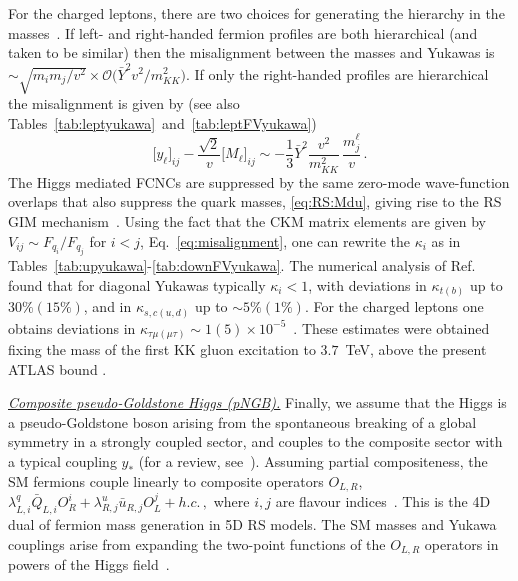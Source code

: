 \documentclass[../report.tex]{subfiles}
\newcommand{\mcO}{\mathcal{O}}
\newcommand{\yvmkk}{\bar Y^2 \frac{v^2}{m_{KK}^2}}
\begin{document}
For the charged leptons, there are two choices for generating the hierarchy in
the masses~\cite{Azatov:2009na}. If left- and right-handed fermion profiles are
both hierarchical (and taken to be similar) then the misalignment between the
masses and Yukawas is $\sim \sqrt{{m_i m_j}/{v^2}} \times \mcO\big(\bar Y^2
v^2/m_{KK}^2\big)$. If only the right-handed profiles are hierarchical the
misalignment is given by (see also
Tables~\ref{tab:leptyukawa}~and~\ref{tab:leptFVyukawa})
\begin{equation}\label{eq:lept-misalignment}
	\big[y_\ell\big]_{ij}-\frac{\sqrt2}{v}\big[M_\ell\big]_{ij}\sim -
	\frac{1}{3}\yvmkk\,\frac{m_j^\ell}{v}\,. \end{equation} The Higgs mediated FCNCs
are suppressed by the same zero-mode wave-function overlaps that also suppress
the quark masses, \eqref{eq:RS:Mdu}, giving rise to the RS GIM
mechanism~\cite{Cacciapaglia:2007fw, Agashe:2004cp, Agashe:2004ay}. Using the
fact that the CKM matrix elements are given by $V_{ij}\sim F_{q_i}/F_{q_j}$ for
$i<j$, Eq.~\eqref{eq:misalignment}, one can rewrite the $\kappa_i$ as in
Tables~\ref{tab:upyukawa}-\ref{tab:downFVyukawa}. The numerical analysis of
Ref.~\cite{Azatov:2009na} found that for diagonal Yukawas typically
$\kappa_i<1$, with deviations in $\kappa_{t(b)}$ up to $30\%(15\%)$, and in
$\kappa_{s,c (u,d)}$ up to $\sim 5\%(1\%)$.
For the charged leptons one obtains deviations in $\kappa_{\tau\mu(\mu\tau)}\sim 1(5)\times 10^{-5}$~\cite{Azatov:2009na}.
These estimates were obtained fixing the mass of the first KK gluon excitation to
$3.7$~TeV, above the present ATLAS bound \cite{ATLAS-CONF-2015-009}.

\underline{\it Composite pseudo-Goldstone Higgs (pNGB).}
Finally, we assume that the Higgs is a
pseudo-Goldstone boson arising from the spontaneous breaking of a
global symmetry in a strongly coupled sector, and  couples to the composite
sector with a typical coupling $y_*$ \cite{Dugan:1984hq,
  Georgi:1984ef, Kaplan:1983sm, Kaplan:1983fs} (for a review, see~\cite{Panico:2015jxa}).
Assuming partial compositeness, the SM fermions couple linearly to composite operators
$O_{L,R}$,
$\lambda_{L,i}^q \bar Q_{L,i} O_R^i+\lambda_{R,j}^u \bar u_{R,j}
O_L^j+h.c. \,,$
where $i,j$ are flavour indices~\cite{Kaplan:1991dc}. This is the 4D dual of fermion
mass generation in 5D RS models.  The SM masses and Yukawa
couplings arise from expanding the two-point functions of the
$O_{L,R}$ operators in powers of the Higgs field~\cite{Agashe:2009di}.
\end{document}
